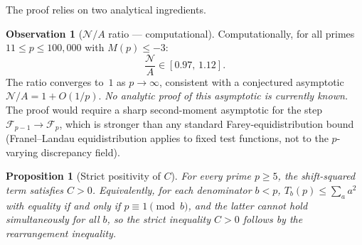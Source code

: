 \documentclass[11pt]{article}
\newtheorem{proposition}[theorem]{Proposition}
\theoremstyle{definition}
\newtheorem{observation}[theorem]{Observation}
\begin{document}
The proof relies on two analytical ingredients.

\begin{observation}[$\mathcal{N}/A$ ratio — computational]\label{prop:DA-ratio}
Computationally, for all primes $11 \le p \le 100{,}000$ with $M(p) \le -3$:
\[
  \frac{\mathcal{N}}{A} \in [0.97,\, 1.12].
\]
The ratio converges to~$1$ as $p \to \infty$, consistent with
a conjectured asymptotic $\mathcal{N}/A = 1 + O(1/p)$.
\emph{No analytic proof of this asymptotic is currently known.}
The proof would require a sharp second-moment asymptotic for the
step $\mathcal{F}_{p-1} \to \mathcal{F}_p$, which is stronger than any
standard Farey-equidistribution bound
(Franel--Landau equidistribution applies to fixed test functions,
not to the $p$-varying discrepancy field).
\end{observation}

\begin{proposition}[Strict positivity of $C$]\label{prop:strict-pos}
For every prime $p \ge 5$, the shift-squared term satisfies $C > 0$.
Equivalently, for each denominator $b < p$,
$T_b(p) \le \sum_{a} a^2$ with equality if and only if
$p \equiv 1 \pmod{b}$, and the latter cannot hold simultaneously
for all $b$, so the strict inequality $C > 0$ follows by the
rearrangement inequality.
\end{proposition}
\end{document}
